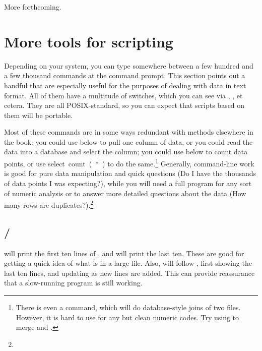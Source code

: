 More forthcoming.



\section{More tools for scripting}
Depending on your system, you can type somewhere between a few hundred
and a few thousand commands at the command prompt. This section points
out a handful that are especially useful for the purposes of dealing
with data in text format.  All of them have a multitude of switches,
which you can see via ,  , et cetera. They are
all POSIX-standard, so you can expect that scripts based on them will be portable.

Most of these commands are in some ways redundant with methods
elsewhere in the book: you could use  below to pull one column
of data, or you could read the data into a database and \si{select}
the column; you could use  below to count data points, or use
\si{select count(*)} to do the same.\footnote{
There is even a 
command, which will do database-style joins of two files. However, it is
hard to use for any but clean numeric codes. Try using  to
merge  and .} Generally, 
command-line work is good for pure data manipulation and quick questions (Do I have the thousands 
of data points I was expecting?), while you will need a full program 
for any sort of numeric analysis or to answer more detailed questions
about the data (How many rows are
duplicates?).\footnote{}

\subsection{/}  will print the
first ten lines of
, and  will print the last ten. These are
good for getting a quick idea of what is in a large file.  Also,
 will follow , first showing the
last ten lines, and updating as new lines are added. This can provide
reassurance that a slow-running program is still working.



